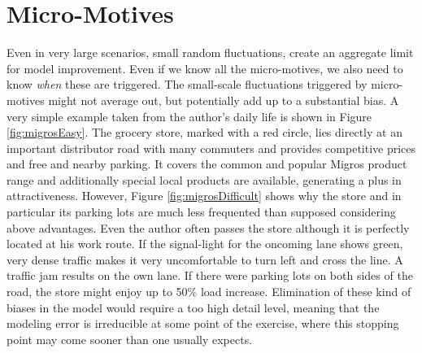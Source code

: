 
\section{Micro-Motives}

Even in very large scenarios, small random fluctuations, create an aggregate limit for model improvement. Even if we know all the micro-motives, we also need to know \emph{when} these are triggered. The small-scale fluctuations triggered by micro-motives might not average out, but potentially add up to a substantial bias. A very simple example taken from the author's daily life is shown in Figure \ref{fig:migrosEasy}. The grocery store, marked with a red circle, lies directly at an important distributor road with many commuters and provides competitive prices and free and nearby parking. It covers the common and popular Migros product range and additionally special local products are available, generating a plus in attractiveness. However, Figure \ref{fig:migrosDifficult} shows why the store and in particular its parking lots are much less frequented than supposed considering above advantages. Even the author often passes the store although it is perfectly located at his work route. If the signal-light for the oncoming lane shows green, very dense traffic makes it very uncomfortable to turn left and cross the line. A traffic jam results on the own lane. If there were parking lots on both sides of the road, the store might enjoy up to 50\% load increase. Elimination of these kind of biases in the model would require a too high detail level, meaning that the modeling error is irreducible at some point of the exercise, where this stopping point may come sooner than one usually expects.



